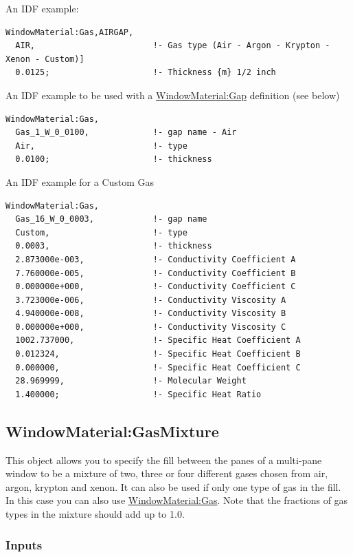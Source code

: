 An IDF example:

\begin{lstlisting}
WindowMaterial:Gas,AIRGAP,
  AIR,                        !- Gas type (Air - Argon - Krypton - Xenon - Custom)]
  0.0125;                     !- Thickness {m} 1/2 inch
\end{lstlisting}

An IDF example to be used with a \hyperref[windowmaterialgap]{WindowMaterial:Gap} definition (see below)

\begin{lstlisting}
WindowMaterial:Gas,
  Gas_1_W_0_0100,             !- gap name - Air
  Air,                        !- type
  0.0100;                     !- thickness
\end{lstlisting}

An IDF example for a Custom Gas

\begin{lstlisting}
WindowMaterial:Gas,
  Gas_16_W_0_0003,            !- gap name
  Custom,                     !- type
  0.0003,                     !- thickness
  2.873000e-003,              !- Conductivity Coefficient A
  7.760000e-005,              !- Conductivity Coefficient B
  0.000000e+000,              !- Conductivity Coefficient C
  3.723000e-006,              !- Conductivity Viscosity A
  4.940000e-008,              !- Conductivity Viscosity B
  0.000000e+000,              !- Conductivity Viscosity C
  1002.737000,                !- Specific Heat Coefficient A
  0.012324,                   !- Specific Heat Coefficient B
  0.000000,                   !- Specific Heat Coefficient C
  28.969999,                  !- Molecular Weight
  1.400000;                   !- Specific Heat Ratio
\end{lstlisting}

\subsection{WindowMaterial:GasMixture}\label{windowmaterialgasmixture}

This object allows you to specify the fill between the panes of a multi-pane window to be a mixture of two, three or four different gases chosen from air, argon, krypton and xenon. It can also be used if only one type of gas in the fill. In this case you can also use \hyperref[windowmaterialgas]{WindowMaterial:Gas}. Note that the fractions of gas types in the mixture should add up to 1.0.

\subsubsection{Inputs}\label{inputs-17-009}

